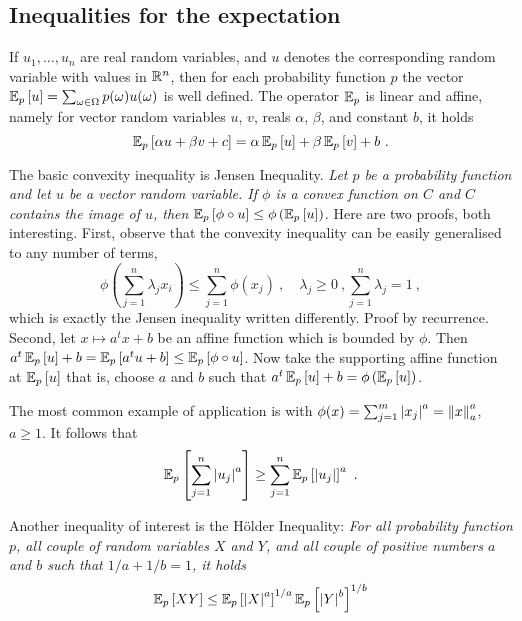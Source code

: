 \documentclass[12pt,a4paper]{amsart}
\theoremstyle{plain}%
\theoremstyle{definition}
\theoremstyle{remark}
\begin{document}
\subsection{Inequalities for the expectation}
\label{sec:ineg-expect}

If $u_1,\dots,u_n$ are real random variables, and $u$ denotes the corresponding random variable with values in $\reals^n$, then for each probability function $p$ the vector $\expectat p u = \sum_{\omega\in\Omega} p(\omega) u(\omega)$ is well defined. The operator $\Expectation_p$ is linear and affine, namely for vector random variables $u$, $v$, reals $\alpha$, $\beta$, and constant $b$, it holds
\begin{equation*}
  \expectat p {\alpha u + \beta v + c} = \alpha \expectat p u + \beta \expectat p v + b \ .
\end{equation*}

The basic convexity inequality is Jensen Inequality. \emph{Let $p$ be a probability function and let $u$ be a vector random variable. If $\phi$ is a convex function on $C$ and $C$ contains the image of $u$, then $\expectat p {\phi\circ u} \leq \phi\left(\expectat p u\right)$.} Here are two proofs, both interesting. First, observe that the convexity inequality can be easily generalised to any number of terms,
\begin{equation*}
  \phi\left(\sum_{j=1}^n \lambda_j x_i\right) \leq \sum_{j=1}^n \phi(x_j) \ , \quad \lambda_j \geq 0 \ , \sum_{j=1}^n \lambda_j = 1 \ ,
\end{equation*}
which is exactly the Jensen inequality written differently. Proof by recurrence. Second, let $x \mapsto a^tx + b$ be an affine function which is bounded by $\phi$. Then $a^t \expectat p u + b = \expectat p {a^tu+b} \leq \expectat p {\phi\circ u}$. Now take the supporting affine function at $\expectat p u$ that is, choose $a$ and $b$ such that $a^t \expectat p u + b = \phi\left(\expectat p u\right)$.

The most common example of application is with $\phi(x) = \sum_{j=1}^m \aval {x_j}^a = \normat a x ^a$, $a \geq 1$. It follows that
\begin{equation*}
  \expectat p {\sum_{j=1}^n \aval{u_j}^a} \geq \sum_{j=1}^n \expectat p {\aval{u_j}}^a \ .
\end{equation*}

Another inequality of interest is the H\"older Inequality: \emph{For all probability function $p$, all couple of random variables $X$ and $Y$, and all couple of positive numbers $a$ and $b$ such that $1/a+1/b = 1$, it holds}
\begin{equation*}
  \expectat p {XY} \leq \expectat p {\aval X ^a}^{1/a} \expectat p {\aval Y ^b}^{1/b}
\end{equation*}
\end{document}
